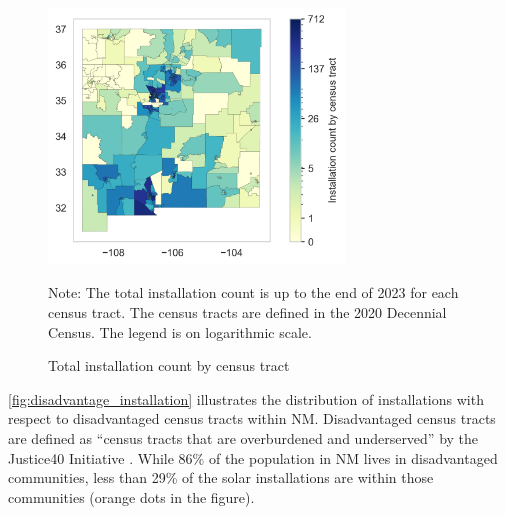 \documentclass[12pt,twoside,letterpaper]{article}
\begin{document}
\begin{figure}[!ht]
    \centering
\includegraphics[width=0.7\textwidth]{figures/tract_count_map.png}
    \caption{Total installation count by census tract}
    \label{fig:tract_map}
    \begin{flushleft}
        \footnotesize Note: The total installation count is up to the end of 2023 for each census tract. The census tracts are defined in the 2020 Decennial Census. The legend is on logarithmic scale.
    \end{flushleft}
\end{figure}

\autoref{fig:disadvantage_installation} illustrates the distribution of installations with respect to disadvantaged census tracts within NM. Disadvantaged census tracts are defined as “census tracts that are overburdened and underserved” by the Justice40 Initiative \parencite{justice40}. While 86\% of the population in NM lives in disadvantaged communities, less than 29\% of the solar installations are within those communities (orange dots in the figure).
\end{document}
